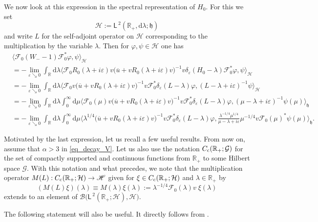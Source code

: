 \documentclass{article}
\def\B{\mathscr B}
\def\d{\mathrm{d}}
\def\F{\mathscr F}
\def\G{\mathcal G}
\def\H{\mathcal H}
\def\R{\mathbb R}
\def\Hrond{\mathscr H}
\def\HS{\mathfrak h}
\def\ltwo{\mathsf{L}^{\:\!\!2}}
\begin{document}
We now look at this expression in the spectral representation of $H_0$.
For this we set 
$$
\Hrond:=\ltwo(\R_+, \d \lambda;\HS)
$$ 
and write $L$ for the self-adjoint operator on $\Hrond$ corresponding to the multiplication by the variable $\lambda$.
Then for $\varphi, \psi \in \Hrond$ one has
\begin{align}\label{eq_WOP}
\nonumber &\langle \F_0 (W_--1)\F_0^*\varphi, \psi\rangle_\Hrond  \\
\nonumber & =  - \lim_{\varepsilon\searrow 0} \int_{\R}\d \lambda 
\langle  \F_0
R_0(\lambda+i\varepsilon) v\big(\overline{u} +v R_0(\lambda+i\varepsilon)v\big)^{-1}v \delta_\varepsilon(H_0-\lambda)\F_0^*\varphi, \psi\rangle_\Hrond \\
\nonumber & =  - \lim_{\varepsilon\searrow 0} \int_{\R}\d \lambda 
\langle  \F_0 v \big(\overline{u} +v R_0(\lambda+i\varepsilon)v\big)^{-1}v \F_0^*\delta_\varepsilon(L-\lambda)\varphi,  (L-\lambda+i\varepsilon)^{-1}\psi\rangle_\Hrond \\
\nonumber & =  - \lim_{\varepsilon\searrow 0} \int_{\R}\d \lambda \int_0^\infty \d \mu 
\big\langle  \F_0(\mu) v \big(\overline{u} +v R_0(\lambda+i\varepsilon)v\big)^{-1}v \F_0^* \delta_\varepsilon(L-\lambda)\varphi,  (\mu-\lambda+i\varepsilon)^{-1}\psi(\mu)\big\rangle_\HS \\
& =  - \lim_{\varepsilon\searrow 0} \int_{\R}\d \lambda \int_0^\infty \d \mu 
\big\langle  \lambda^{1/4}\big(\overline{u} +v R_0(\lambda+i\varepsilon)v\big)^{-1}v \F_0^*\delta_\varepsilon(L-\lambda)\varphi, 
 \frac{ \lambda^{-1/4}\mu^{1/4}}{\mu-\lambda+i\varepsilon} \mu^{-1/4}v\F_0(\mu)^*\psi(\mu)\big\rangle_\HS.
\end{align}

Motivated by the last expression, let us recall a few useful results.
From now on, assume that $\alpha >3$ in \eqref{eq_decay_V}. 
Let us also use the notation $C_{\rm c}(\R_+;\G)$ for the set of compactly
supported and continuous functions from $\R_+$ to some Hilbert space $\G$. With this
notation and what precedes, we note that the multiplication operator
$M(L) :C_{\rm c}(\R_+;\H)\to\Hrond$ given for $\xi\in C_{\rm c}(\R_+;\H)$ and $\lambda\in\R_+$
 by 
\begin{equation*}
(M(L)\xi)(\lambda)\equiv M(\lambda)\xi(\lambda):=\lambda^{-1/4}\F_0(\lambda)v\;\!\xi(\lambda)
\end{equation*}
extends to an element of
$\B\big(\ltwo(\R_+;\H),\Hrond\big)$.

The following statement will also be useful. It directly follows from \cite[Lem.~2.3]{RT13}.
\end{document}
